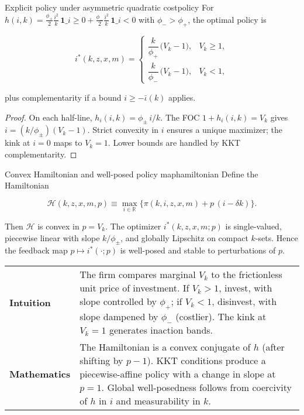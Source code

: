 \documentclass[11pt,letterpaper,oneside]{article}
\numberwithin{equation}{section}
\newcommand{\R}{\mathbb{R}}
\newcommand{\1}{\mathbf{1}}
\newcommand{\ind}[1]{\mathbf{1}\_{{#1}}}
\newcommand{\kbar}{\bar\iota}
\begin{document}
\begin{proposition}{Explicit policy under asymmetric quadratic cost}{policy}
For
$h(i,k)=\tfrac{\phi_+}{2}\tfrac{i^2}{k}\,\ind{i\ge 0}
+\tfrac{\phi_-}{2}\tfrac{i^2}{k}\,\ind{i<0}$
with $\phi_->\phi_+$, the optimal policy is

$$
i^*(k,z,x,m)=
\begin{cases}
\dfrac{k}{\phi_+}\,\big(V_k-1\big), & V_k\ge 1,\\[6pt]
\dfrac{k}{\phi_-}\,\big(V_k-1\big), & V_k< 1,
\end{cases}
$$

plus complementarity if a bound $i\ge -\kbar(k)$ applies.
\end{proposition}
\begin{proof}
On each half-line, $h_i(i,k)=\phi_\pm\,i/k$. The FOC $1+h_i(i,k)=V_k$ gives $i=(k/\phi_\pm)(V_k-1)$. Strict convexity in $i$ ensures a unique maximizer; the kink at $i=0$ maps to $V_k=1$. Lower bounds are handled by KKT complementarity.
\end{proof}


\begin{proposition}{Convex Hamiltonian and well-posed policy map}{hamiltonian}
Define the Hamiltonian

$$
\mathcal{H}(k,z,x,m,p)\equiv \max_{i\in\R}\{\pi(k,i,z,x,m)+p\,(i-\delta k)\}.
$$

Then $\mathcal{H}$ is convex in $p=V_k$. The optimizer $i^*(k,z,x,m;p)$ is single-valued, piecewise linear with slope $k/\phi_\pm$, and globally Lipschitz on compact $k$-sets. Hence the feedback map $p\mapsto i^*(\cdot;p)$ is well-posed and stable to perturbations of $p$.
\end{proposition}

\begin{tcolorbox}[didacticstyle]
\sloppy
\begin{tabularx}{\textwidth}{@{}p{}X@{}}
\textbf{Intuition} & The firm compares marginal $V_k$ to the frictionless unit price of investment. If $V_k>1$, invest, with slope controlled by $\phi_+$; if $V_k<1$, disinvest, with slope dampened by $\phi_-$ (costlier). The kink at $V_k=1$ generates inaction bands.\\
\textbf{Mathematics} & The Hamiltonian is a convex conjugate of $h$ (after shifting by $p-1$). KKT conditions produce a piecewise-affine policy with a change in slope at $p=1$. Global well-posedness follows from coercivity of $h$ in $i$ and measurability in $k$.
\end{tabularx}
\end{tcolorbox}
\end{document}
